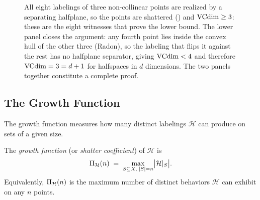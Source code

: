 \begin{figure}[ht]
\caption[Three points shattered by halfplanes; no four are, so the VC dimension is three.]{All eight labelings of three non-collinear points are realized by a separating halfplane, so the points are shattered () and $\mathrm{VCdim} \ge 3$: these are the eight witnesses that prove the lower bound. The lower panel closes the argument: any fourth point lies inside the convex hull of the other three (Radon), so the labeling that flips it against the rest has no halfplane separator, giving $\mathrm{VCdim} < 4$ and therefore $\mathrm{VCdim} = 3 = d+1$ for halfspaces in $d$ dimensions. The two panels together constitute a complete proof.}
\label{fig:shatter-halfplane}
\end{figure}


\subsection{The Growth Function}

The growth function measures how many distinct labelings $\mathcal{H}$ can
produce on sets of a given size.

\begin{defn}
\label{def:growth-function}
The \emph{growth function} (or \emph{shatter coefficient}) of $\mathcal{H}$ is
\[
  \Pi_\mathcal{H}(n) \;=\; \max_{S \subseteq X,\; |S|=n}
  \bigl|\mathcal{H}|_S\bigr|.
\]
Equivalently, $\Pi_\mathcal{H}(n)$ is the maximum number of distinct
behaviors $\mathcal{H}$ can exhibit on any $n$ points.
\end{defn}

